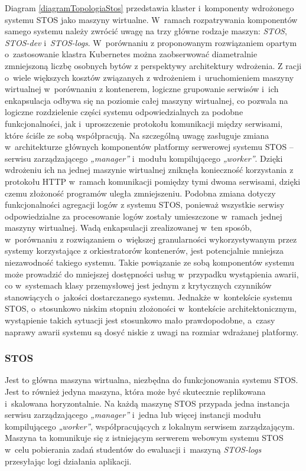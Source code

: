 \noindent Diagram \ref{diagramTopologiaStos} przedstawia klaster i~komponenty wdrożonego systemu STOS jako maszyny wirtualne. W~ramach rozpatrywania komponentów samego systemu należy zwrócić uwagę na trzy główne rodzaje maszyn: \textit{STOS}, \textit{STOS-dev} i~\textit{STOS-logs}. W~porównaniu z proponowanym rozwiązaniem opartym o~zastosowanie klastra Kubernetes można zaobserwować diametralnie zmniejszoną liczbę osobnych bytów z perspektywy architektury wdrożenia. Z racji o~wiele większych kosztów związanych z wdrożeniem i~uruchomieniem maszyny wirtualnej w~porównaniu z kontenerem, logiczne grupowanie serwisów i~ich enkapsulacja odbywa się na poziomie całej maszyny wirtualnej, co pozwala na logiczne rozdzielenie części systemu odpowiedzialnych za podobne funkcjonalności, jak i~uproszczenie protokołu komunikacji między serwisami, które ściśle ze sobą współpracują. Na szczególną uwagę zasługuje zmiana w~architekturze głównych komponentów platformy serwerowej systemu STOS -- serwisu zarządzającego \textit{„manager”} i~modułu kompilującego \textit{„worker”}. Dzięki wdrożeniu ich na jednej maszynie wirtualnej zniknęła konieczność korzystania z protokołu HTTP w~ramach komunikacji pomiędzy tymi dwoma serwisami, dzięki czemu złożoność programów uległa zmniejszeniu. Podobna zmiana dotyczy funkcjonalności agregacji logów z systemu STOS, ponieważ wszystkie serwisy odpowiedzialne za procesowanie logów zostały umieszczone w~ramach jednej maszyny wirtualnej.
\noindent Wadą enkapsulacji zrealizowanej w~ten sposób, w~porównaniu z rozwiązaniem o~większej granularności wykorzystywanym przez systemy korzystające z orkiestratorów kontenerów, jest potencjalnie mniejsza niezawodność takiego systemu. Takie powiązanie ze sobą komponentów systemu może prowadzić do mniejszej dostępności usług w~przypadku wystąpienia awarii, co w~systemach klasy przemysłowej jest jednym z krytycznych czynników stanowiących o~jakości dostarczanego systemu. Jednakże w~kontekście systemu STOS, o~stosunkowo niskim stopniu złożoności w~kontekście architektonicznym, wystąpienie takich sytuacji jest stosunkowo mało prawdopodobne, a~czasy naprawy awarii systemu są dosyć niskie z uwagi na rozmiar wdrażanej platformy.

\subsubsection{STOS}
Jest to główna maszyna wirtualna, niezbędna do funkcjonowania systemu STOS. Jest to również jedyna maszyna, która może być skutecznie replikowana i~skalowana horyzontalnie. Na każdą maszynę STOS przypada jedna instancja serwisu zarządzającego \textit{„manager”} i~jedna lub więcej instancji modułu kompilującego \textit{„worker”}, współpracujących z lokalnym serwisem zarządzającym. Maszyna ta komunikuje się z istniejącym serwerem webowym systemu STOS w~celu pobierania zadań studentów do ewaluacji i~maszyną \textit{STOS-logs} przesyłając logi działania aplikacji.


